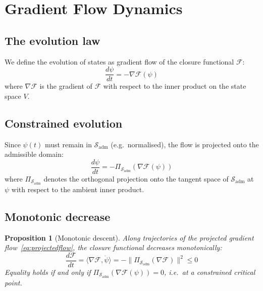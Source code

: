 \documentclass[12pt]{article}
\newtheorem{proposition}[theorem]{Proposition}
\newcommand{\Fcal}{\mathcal{F}}
\newcommand{\Sadm}{\mathcal{S}_{\mathrm{adm}}}
\begin{document}
\section{Gradient Flow Dynamics}\label{sec:gradflow}

\subsection{The evolution law}

We define the evolution of states as gradient flow of the closure functional $\Fcal$:
\begin{equation}\label{eq:gradientflow}
    \frac{d\psi}{dt} = -\nabla \Fcal(\psi)
\end{equation}
where $\nabla \Fcal$ is the gradient of $\Fcal$ with respect to the inner product on the state space $V$.

\subsection{Constrained evolution}

Since $\psi(t)$ must remain in $\Sadm$ (e.g.\ normalised), the flow is projected onto the admissible domain:
\begin{equation}\label{eq:projectedflow}
    \frac{d\psi}{dt} = -\Pi_{\Sadm}\!\left(\nabla \Fcal(\psi)\right)
\end{equation}
where $\Pi_{\Sadm}$ denotes the orthogonal projection onto the tangent space of $\Sadm$ at $\psi$ with respect to the ambient inner product.

\subsection{Monotonic decrease}

\begin{proposition}[Monotonic descent]\label{prop:descent}
Along trajectories of the projected gradient flow~\eqref{eq:projectedflow}, the closure functional decreases monotonically:
\begin{equation}
    \frac{d\Fcal}{dt} = \langle \nabla\Fcal, \dot{\psi} \rangle = -\|\Pi_{\Sadm}(\nabla\Fcal)\|^2 \leq 0
\end{equation}
Equality holds if and only if $\Pi_{\Sadm}(\nabla\Fcal(\psi)) = 0$, i.e.\ at a constrained critical point.
\end{proposition}
\end{document}
